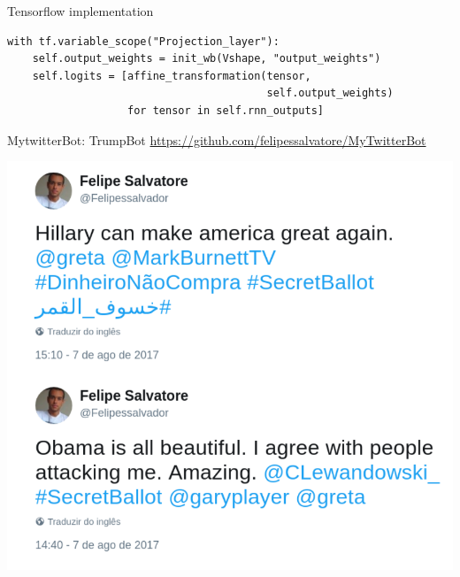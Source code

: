 \documentclass[10pt]{beamer}
\begin{document}
\begin{frame}[fragile]{Tensorflow implementation}
\begin{verbatim}
with tf.variable_scope("Projection_layer"):
    self.output_weights = init_wb(Vshape, "output_weights")
    self.logits = [affine_transformation(tensor,
                                         self.output_weights)
                   for tensor in self.rnn_outputs]
\end{verbatim}
\end{frame}

\begin{frame}{MytwitterBot: TrumpBot}
\url{https://github.com/felipessalvatore/MyTwitterBot}
\begin{center}
\includegraphics[scale=0.24]{images/TrumpBot.png}
\end{center}
\end{frame}
\end{document}
